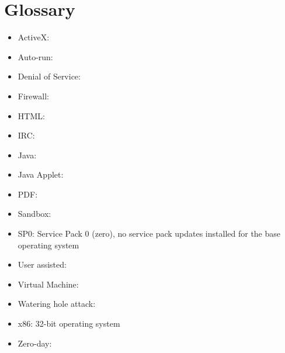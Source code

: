 \newpage
\section{Glossary}

\begin{itemize}
\item ActiveX:
\item Auto-run:
\item Denial of Service:
\item Firewall:
\item HTML:
\item IRC:
\item Java:
\item Java Applet:
\item PDF:
\item Sandbox:
\item SP0: Service Pack 0 (zero), no service pack updates installed for the base operating system
\item User assisted: 
\item Virtual Machine:
\item Watering hole attack:
\item x86: 32-bit operating system
\item Zero-day:
\end{itemize}